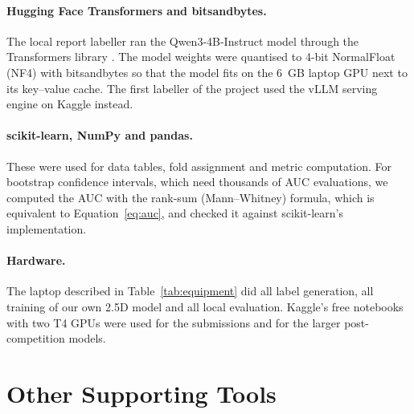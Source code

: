\paragraph{Hugging Face Transformers and bitsandbytes.} The local report labeller ran the Qwen3-4B-Instruct model \cite{yang2025qwen3} through the Transformers library \cite{wolf2020transformers}. The model weights were quantised to 4-bit NormalFloat (NF4) with bitsandbytes \cite{dettmers2023qlora,bitsandbytes} so that the model fits on the 6~GB laptop GPU next to its key--value cache. The first labeller of the project used the vLLM serving engine \cite{kwon2023vllm} on Kaggle instead.

\paragraph{scikit-learn, NumPy and pandas.} These were used for data tables, fold assignment and metric computation. For bootstrap confidence intervals, which need thousands of AUC evaluations, we computed the AUC with the rank-sum (Mann--Whitney) formula, which is equivalent to Equation~\eqref{eq:auc}, and checked it against scikit-learn's implementation.

\paragraph{Hardware.} The laptop described in Table~\ref{tab:equipment} did all label generation, all training of our own 2.5D model and all local evaluation. Kaggle's free notebooks with two T4 GPUs were used for the submissions and for the larger post-competition models.

\section{Other Supporting Tools}

